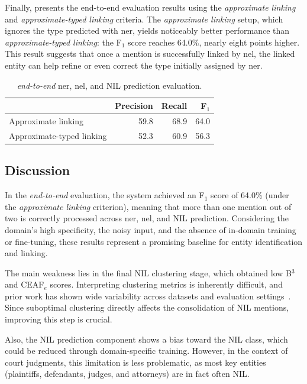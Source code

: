 Finally,  presents the end-to-end evaluation results using the \textit{approximate linking} and \textit{approximate-typed linking} criteria. The \textit{approximate linking} setup, which ignores the type predicted with \ac{ner}, yields noticeably better performance than \textit{approximate-typed linking}: the F$_1$ score reaches 64.0\%, nearly eight points higher. This result suggests that once a mention is successfully linked by \ac{nel}, the linked entity can help refine or even correct the type initially assigned by \ac{ner}.


\begin{table}[H]
    \centering
    \begin{tabular}{lrrr}
        \toprule
        & \textbf{Precision} & \textbf{Recall} & \textbf{F$_1$} \\
        \midrule
        Approximate linking      & 59.8 & 68.9 & 64.0 \\
        Approximate-typed linking & 52.3 & 60.9 & 56.3 \\
        \bottomrule
    \end{tabular}
    \caption{\textit{end-to-end} \ac{ner}, \ac{nel}, and NIL prediction evaluation.}
    \label{tab:nereval:withlink}
\end{table}

\subsection{Discussion}
In the \textit{end-to-end} evaluation, the system achieved an F$_1$ score of 64.0\% (under the \textit{approximate linking} criterion), meaning that more than one mention out of two is correctly processed across \ac{ner}, \ac{nel}, and NIL prediction. Considering the domain's high specificity, the noisy input, and the absence of in-domain training or fine-tuning, these results represent a promising baseline for entity identification and linking.

The main weakness lies in the final NIL clustering stage, which obtained low B$^3$ and CEAF$_e$ scores. Interpreting clustering metrics is inherently difficult, and prior work has shown wide variability across datasets and evaluation settings~\cite{streaming_crossdoc_coreference}. Since suboptimal clustering directly affects the consolidation of NIL mentions, improving this step is crucial.

Also, the NIL prediction component shows a bias toward the NIL class, which could be reduced through domain-specific training. However, in the context of court judgments, this limitation is less problematic, as most key entities (\eg plaintiffs, defendants, judges, and attorneys) are in fact often NIL.

